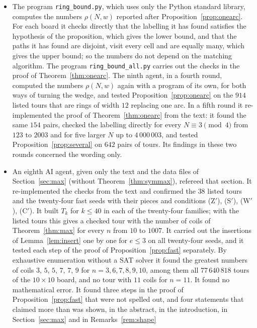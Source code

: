 \documentclass[11pt]{amsart}
\theoremstyle{remark}
\begin{document}
\begin{itemize}
than was shown or used a letter twice; these are corrected here. It also found the certificate for $n=10$
mentioned above.
\item The program \texttt{ring\_bound.py}, which uses only the Python standard library, computes the numbers
$\rho(N,w)$ reported after Proposition~\ref{prop:onearc}. For each board it checks directly that the labelling it
has found satisfies the hypothesis of the proposition, which gives the lower bound, and that the paths it has found
are disjoint, visit every cell and are equally many, which gives the upper bound; so the numbers do not depend on the
matching algorithm. The program \texttt{ring\_bound\_all.py} carries out the checks in the proof of
Theorem~\ref{thm:onearc}. The ninth agent, in a fourth round, computed the numbers $\rho(N,w)$ again with a program
of its own, for both ways of turning the wedge, and tested Proposition~\ref{prop:onearc} on the $914$ listed tours
that are rings of width $12$ replacing one arc. In a fifth round it re-implemented the proof of
Theorem~\ref{thm:onearc} from the text: it found the same $154$ pairs, checked the labelling directly for every
$N\equiv3\pmod 4$ from $123$ to $2003$ and for five larger $N$ up to $4\,000\,003$, and tested
Proposition~\ref{prop:several} on $642$ pairs of tours. Its findings in these two rounds concerned the wording
only.
\item An eighth AI agent, given only the text and the data files of Section~\ref{sec:max} (without
Theorem~\ref{thm:symmax}), refereed that section. It re-implemented the checks from the text and confirmed the $38$
listed tours and the twenty-four fast seeds with their pieces and conditions (Z$'$), (S$'$), (W$'$), (C$'$). It built
$T_k$ for $k\le40$ in each of the twenty-four families; with the listed tours this gives a checked tour with the
number of coils of Theorem~\ref{thm:max} for every $n$ from $10$ to $1007$. It carried out the insertions of
Lemma~\ref{lem:insert} one by one for $e\le3$ on all twenty-four seeds, and it tested each step of the proof of
Proposition~\ref{prop:fast} separately. By exhaustive enumeration without a SAT solver it found the greatest
numbers of coils $3$, $5$, $5$, $7$, $7$, $9$ for $n=3,6,7,8,9,10$, among them all $77\,640\,818$ tours of the
$10\times10$ board, and no tour with $11$ coils for $n=11$. It found no mathematical error. It found three steps in
the proof of Proposition~\ref{prop:fast} that were not spelled out, and four statements that claimed more than was
shown, in the abstract, in the introduction, in Section~\ref{sec:max} and in Remarks~\ref{rem:shape}

\end{itemize}
\end{document}
